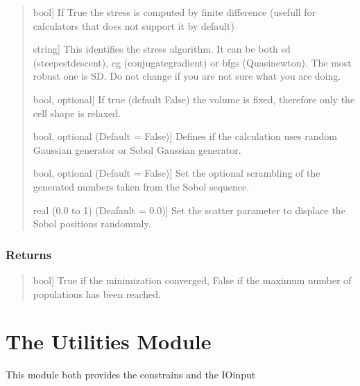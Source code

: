 \documentclass[a4paper,11pt,english]{sphinxmanual}
\begin{document}
\begin{fulllineitems}
\begin{fulllineitems}
\begin{quote}
\begin{description}
\sphinxlineitem{stress\_numerical}{[}bool{]}
\sphinxAtStartPar
If True the stress is computed by finite difference (usefull for calculators that
does not support it by default)

\sphinxlineitem{cell\_relax\_algorithm}{[}string{]}
\sphinxAtStartPar
This identifies the stress algorithm. It can be both sd (steepest\sphinxhyphen{}descent),
cg (conjugate\sphinxhyphen{}gradient) or bfgs (Quasi\sphinxhyphen{}newton).
The most robust one is SD. Do not change if you are not sure what you are doing.

\sphinxlineitem{fix\_volume}{[}bool, optional{]}
\sphinxAtStartPar
If true (default False) the volume is fixed, therefore only the cell shape is relaxed.

\sphinxlineitem{sobol}{[}bool, optional (Default = False){]}
\sphinxAtStartPar
Defines if the calculation uses random Gaussian generator or Sobol Gaussian generator.

\sphinxlineitem{sobol\_scramble}{[}bool, optional (Default = False){]}
\sphinxAtStartPar
Set the optional scrambling of the generated numbers taken from the Sobol sequence.

\sphinxlineitem{sobol\_scatter}{[}real (0.0 to 1) (Deafault = 0.0){]}
\sphinxAtStartPar
Set the scatter parameter to displace the Sobol positions randommly.

\end{description}
\end{quote}


\subsubsection{Returns}
\label{\detokenize{apireference:id43}}\begin{quote}
\begin{description}
\sphinxlineitem{status}{[}bool{]}
\sphinxAtStartPar
True if the minimization converged, False if the maximum number of
populations has been reached.

\end{description}
\end{quote}

\end{fulllineitems}


\end{fulllineitems}



\section{The Utilities Module}
\label{\detokenize{apireference:the-utilities-module}}
\sphinxAtStartPar
This module both provides the constrains and the IOinput
\end{document}
